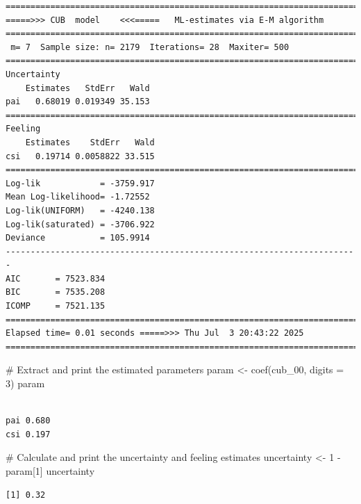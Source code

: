 \documentclass[
  letterpaper,
  DIV=11,
  numbers=noendperiod]{scrartcl}
\newenvironment{Shaded}{\begin{snugshade}}{\end{snugshade}}
\newcommand{\AttributeTok}[1]{\textcolor[rgb]{0.40,0.45,0.13}{#1}}
\newcommand{\CommentTok}[1]{\textcolor[rgb]{0.37,0.37,0.37}{#1}}
\newcommand{\DecValTok}[1]{\textcolor[rgb]{0.68,0.00,0.00}{#1}}
\newcommand{\FunctionTok}[1]{\textcolor[rgb]{0.28,0.35,0.67}{#1}}
\newcommand{\NormalTok}[1]{\textcolor[rgb]{0.00,0.23,0.31}{#1}}
\newcommand{\OtherTok}[1]{\textcolor[rgb]{0.00,0.23,0.31}{#1}}
\newcommand{\SpecialCharTok}[1]{\textcolor[rgb]{0.37,0.37,0.37}{#1}}
\begin{document}
\begin{verbatim}
======================================================================= 
=====>>> CUB  model    <<<=====   ML-estimates via E-M algorithm   
======================================================================= 
 m= 7  Sample size: n= 2179  Iterations= 28  Maxiter= 500 
======================================================================= 
Uncertainty                                            
    Estimates   StdErr   Wald
pai   0.68019 0.019349 35.153
======================================================================= 
Feeling                                            
    Estimates    StdErr   Wald
csi   0.19714 0.0058822 33.515
======================================================================= 
Log-lik            = -3759.917 
Mean Log-likelihood= -1.72552 
Log-lik(UNIFORM)   = -4240.138 
Log-lik(saturated) = -3706.922 
Deviance           = 105.9914 
----------------------------------------------------------------------- 
AIC       = 7523.834 
BIC       = 7535.208 
ICOMP     = 7521.135 
======================================================================= 
Elapsed time= 0.01 seconds =====>>> Thu Jul  3 20:43:22 2025 
======================================================================= 
\end{verbatim}

\begin{Shaded}
\begin{Highlighting}[]
\CommentTok{\# Extract and print the estimated parameters}
\NormalTok{param }\OtherTok{\textless{}{-}} \FunctionTok{coef}\NormalTok{(cub\_00, }\AttributeTok{digits =} \DecValTok{3}\NormalTok{)}
\NormalTok{param}
\end{Highlighting}
\end{Shaded}

\begin{verbatim}
         
pai 0.680
csi 0.197
\end{verbatim}

\begin{Shaded}
\begin{Highlighting}[]
\CommentTok{\# Calculate and print the uncertainty and feeling estimates}
\NormalTok{uncertainty }\OtherTok{\textless{}{-}} \DecValTok{1} \SpecialCharTok{{-}}\NormalTok{ param[}\DecValTok{1}\NormalTok{]}
\NormalTok{uncertainty}
\end{Highlighting}
\end{Shaded}

\begin{verbatim}
[1] 0.32
\end{verbatim}
\end{document}
